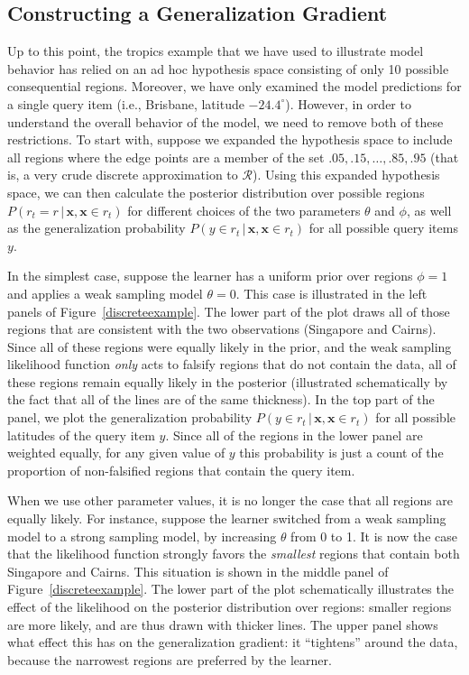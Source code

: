 \documentclass[doc]{apa6}
\newcommand{\xn}{{\bm{x}}}
\newcommand{\rt}{{r_t}}
\newcommand{\condon}{\, | \,}
\begin{document}
\subsection{Constructing a Generalization Gradient}

Up to this point, the tropics example that we have used to illustrate model behavior has relied on an ad hoc hypothesis space consisting of only 10 possible consequential regions. Moreover, we have only examined the model predictions for a single query item (i.e., Brisbane, latitude $-24.4^\circ$). However, in order to understand the overall behavior of the model, we need to remove both of these restrictions. To start with, suppose we expanded the hypothesis space to include all regions where the edge points are a member of the set $.05, .15, \ldots, .85, .95$ (that is, a very crude discrete approximation to $\mathcal{R}$). Using this expanded hypothesis space, we can then calculate the posterior distribution over possible regions $P(\rt = r \condon \xn, \xn \in \rt)$ for different choices of the two parameters $\theta$ and $\phi$, as well as the generalization probability $P(y \in \rt \condon \xn, \xn \in \rt)$ for all possible query items $y$.

In the simplest case, suppose the learner has a uniform prior over regions $\phi = 1$ and applies a weak sampling model $\theta = 0$. This case is illustrated in the left panels of Figure~\ref{discreteexample}. The lower part of the plot draws all of those regions that are consistent with the two observations (Singapore and Cairns). Since all of these regions were equally likely in the prior, and the weak sampling likelihood function {\it only} acts to falsify regions that do not contain the data, all of these regions remain equally likely in the posterior (illustrated schematically by the fact that all of the lines are of the same thickness). In the top part of the panel, we plot the generalization probability $P(y \in \rt \condon \xn, \xn \in \rt)$ for all possible latitudes of the query item $y$. Since all of the regions in the lower panel are weighted equally, for any given value of $y$ this probability is just a count of the proportion of non-falsified regions that contain the query item.

When we use other parameter values, it is no longer the case that all regions are equally likely. For instance, suppose the learner switched from a weak sampling model to a strong sampling model, by increasing $\theta$ from 0 to 1. It is now the case that the likelihood function strongly favors the {\it smallest} regions that contain both Singapore and Cairns. This situation is shown in the middle panel of Figure~\ref{discreteexample}. The lower part of the plot schematically illustrates the effect of the likelihood on the posterior distribution over regions: smaller regions are more likely, and are thus drawn with thicker lines. The upper panel shows what effect this has on the generalization gradient: it ``tightens'' around the data, because the narrowest regions are preferred by the learner.
\end{document}
